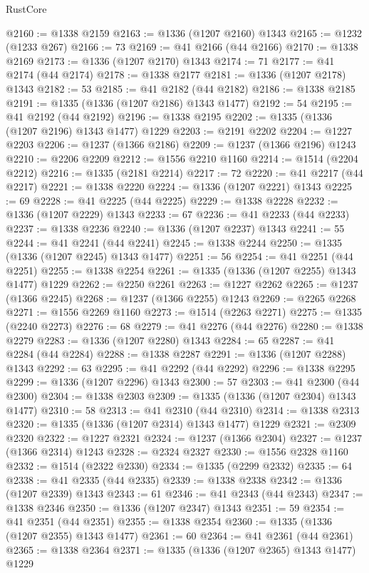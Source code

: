 \begin{lexlean}{RustCore}
\begin{coremodule}
@2160 := @1338 @2159
@2163 := @1336 (@1207 @2160) @1343
@2165 := @1232 (@1233 @267)
@2166 := 73
@2169 := @41 @2166 (@44 @2166)
@2170 := @1338 @2169
@2173 := @1336 (@1207 @2170) @1343
@2174 := 71
@2177 := @41 @2174 (@44 @2174)
@2178 := @1338 @2177
@2181 := @1336 (@1207 @2178) @1343
@2182 := 53
@2185 := @41 @2182 (@44 @2182)
@2186 := @1338 @2185
@2191 := @1335 (@1336 (@1207 @2186) @1343 @1477)
@2192 := 54
@2195 := @41 @2192 (@44 @2192)
@2196 := @1338 @2195
@2202 := @1335 (@1336 (@1207 @2196) @1343 @1477) @1229
@2203 := @2191 @2202
@2204 := @1227 @2203
@2206 := @1237 (@1366 @2186)
@2209 := @1237 (@1366 @2196) @1243
@2210 := @2206 @2209
@2212 := @1556 @2210 @1160
@2214 := @1514 (@2204 @2212)
@2216 := @1335 (@2181 @2214)
@2217 := 72
@2220 := @41 @2217 (@44 @2217)
@2221 := @1338 @2220
@2224 := @1336 (@1207 @2221) @1343
@2225 := 69
@2228 := @41 @2225 (@44 @2225)
@2229 := @1338 @2228
@2232 := @1336 (@1207 @2229) @1343
@2233 := 67
@2236 := @41 @2233 (@44 @2233)
@2237 := @1338 @2236
@2240 := @1336 (@1207 @2237) @1343
@2241 := 55
@2244 := @41 @2241 (@44 @2241)
@2245 := @1338 @2244
@2250 := @1335 (@1336 (@1207 @2245) @1343 @1477)
@2251 := 56
@2254 := @41 @2251 (@44 @2251)
@2255 := @1338 @2254
@2261 := @1335 (@1336 (@1207 @2255) @1343 @1477) @1229
@2262 := @2250 @2261
@2263 := @1227 @2262
@2265 := @1237 (@1366 @2245)
@2268 := @1237 (@1366 @2255) @1243
@2269 := @2265 @2268
@2271 := @1556 @2269 @1160
@2273 := @1514 (@2263 @2271)
@2275 := @1335 (@2240 @2273)
@2276 := 68
@2279 := @41 @2276 (@44 @2276)
@2280 := @1338 @2279
@2283 := @1336 (@1207 @2280) @1343
@2284 := 65
@2287 := @41 @2284 (@44 @2284)
@2288 := @1338 @2287
@2291 := @1336 (@1207 @2288) @1343
@2292 := 63
@2295 := @41 @2292 (@44 @2292)
@2296 := @1338 @2295
@2299 := @1336 (@1207 @2296) @1343
@2300 := 57
@2303 := @41 @2300 (@44 @2300)
@2304 := @1338 @2303
@2309 := @1335 (@1336 (@1207 @2304) @1343 @1477)
@2310 := 58
@2313 := @41 @2310 (@44 @2310)
@2314 := @1338 @2313
@2320 := @1335 (@1336 (@1207 @2314) @1343 @1477) @1229
@2321 := @2309 @2320
@2322 := @1227 @2321
@2324 := @1237 (@1366 @2304)
@2327 := @1237 (@1366 @2314) @1243
@2328 := @2324 @2327
@2330 := @1556 @2328 @1160
@2332 := @1514 (@2322 @2330)
@2334 := @1335 (@2299 @2332)
@2335 := 64
@2338 := @41 @2335 (@44 @2335)
@2339 := @1338 @2338
@2342 := @1336 (@1207 @2339) @1343
@2343 := 61
@2346 := @41 @2343 (@44 @2343)
@2347 := @1338 @2346
@2350 := @1336 (@1207 @2347) @1343
@2351 := 59
@2354 := @41 @2351 (@44 @2351)
@2355 := @1338 @2354
@2360 := @1335 (@1336 (@1207 @2355) @1343 @1477)
@2361 := 60
@2364 := @41 @2361 (@44 @2361)
@2365 := @1338 @2364
@2371 := @1335 (@1336 (@1207 @2365) @1343 @1477) @1229

\end{coremodule}
\end{lexlean}
